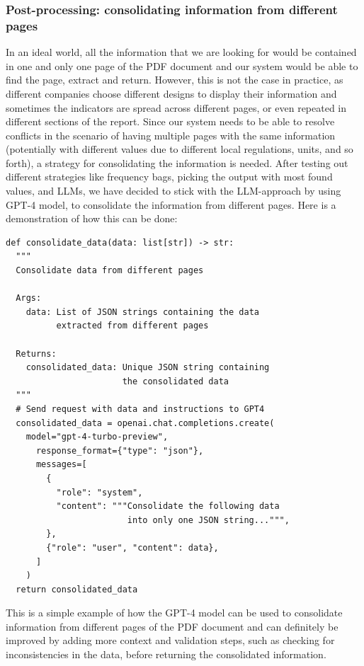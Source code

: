\documentclass[english, 12pt, a4paper, elec, utf8, a-2b, online]{aaltothesis}
\begin{document}


\subsubsection{Post-processing: consolidating information from different pages}

In an ideal world, all the information that we are looking for would be contained in one and only one page of the \ac{PDF} document and our system would be able to find the page, extract and return.
However, this is not the case in practice, as different companies choose different designs to display their information and sometimes the indicators are spread across different pages, or even repeated in different sections of the report.
Since our system needs to be able to resolve conflicts in the scenario of having multiple pages with the same information (potentially with different values due to different local regulations, units, and so forth), a strategy for consolidating the information is needed.
After testing out different strategies like frequency bags, picking the output with most found values, and \ac{LLM}s, we have decided to stick with the \ac{LLM}-approach by using \ac{GPT}-4 model, to consolidate the information from different pages.
Here is a demonstration of how this can be done:

\begin{verbatim}
def consolidate_data(data: list[str]) -> str:
  """
  Consolidate data from different pages

  Args:
    data: List of JSON strings containing the data
          extracted from different pages

  Returns:
    consolidated_data: Unique JSON string containing
                       the consolidated data
  """
  # Send request with data and instructions to GPT4
  consolidated_data = openai.chat.completions.create(
    model="gpt-4-turbo-preview",
      response_format={"type": "json"},
      messages=[
        {
          "role": "system",
          "content": """Consolidate the following data
                        into only one JSON string...""",
        },
        {"role": "user", "content": data},
      ]
    )
  return consolidated_data
\end{verbatim}

This is a simple example of how the \ac{GPT}-4 model can be used to consolidate information from different pages of the \ac{PDF} document and can definitely be improved by adding more context and validation steps, such as checking for inconsistencies in the data, before returning the consolidated information.
\end{document}
